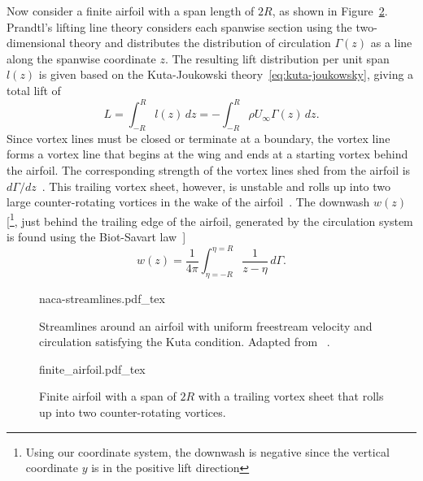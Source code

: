 Now consider a finite airfoil with a span length of $2R$, as shown in Figure~\ref{fig:finite_airfoil}. Prandtl's lifting line theory considers each spanwise section using the two-dimensional theory and distributes the distribution of circulation $\Gamma(z)$ as a line along the spanwise coordinate $z$. The resulting lift distribution per unit span $l(z)$ is given based on the Kuta-Joukowski theory~\eqref{eq:kuta-joukowsky}, giving a total lift of~\cite[pg. 197]{Milne-Thomson1973a}
\begin{equation}
L = \int_{-R}^R l(z) \, dz = - \int_{-R}^R \rho U_\infty \Gamma(z) \, dz.
\end{equation}
Since vortex lines must be closed or terminate at a boundary, the vortex line forms a vortex line that begins at the wing and ends at a starting vortex behind the airfoil. The corresponding strength of the vortex lines shed from the airfoil is $d\Gamma/dz$~\cite[pg. 195]{Milne-Thomson1973a}. This trailing vortex sheet, however, is unstable and rolls up into two large counter-rotating vortices in the wake of the airfoil~\cite[pg. 185]{Milne-Thomson1973a}. The downwash $w(z)$ [\footnote{Using our coordinate system, the downwash is negative since the vertical coordinate $y$ is in the positive lift direction}, just behind the trailing edge of the airfoil, generated by the circulation system is found using the Biot-Savart law~\cite[pg. 197]{Milne-Thomson1973a}] 
\begin{equation}
\label{eq:downwash}
w(z) = \frac{1}{4\pi}\int_{\eta=-R}^{\eta=R} \frac{1}{z-\eta} \, d \Gamma.
\end{equation}


\begin{figure}
\begin{center}
{naca-streamlines.pdf_tex}
\end{center}
\caption{\label{fig:naca-streamlines} Streamlines around an airfoil with uniform freestream velocity and circulation satisfying the Kuta condition. Adapted from ~\cite{Belisle2008a}.}%
\end{figure}


\begin{figure}
\begin{center}
{finite_airfoil.pdf_tex}
\end{center}
\caption{\label{fig:finite_airfoil} Finite airfoil with a span of $2R$ with a trailing vortex sheet that rolls up into two counter-rotating vortices.}%
\end{figure}


